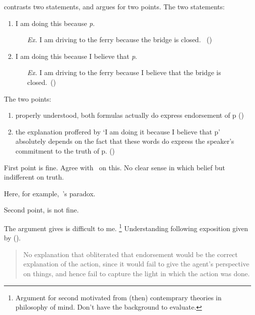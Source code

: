 \begin{note}[Distinction]
  \citeauthor{Collins:1997wn} contrasts two statements, and argues for two points.
  The two statements:
  \begin{enumerate}[noitemsep]
  \item
    I am doing this because \emph{p}.
    \begin{itemize}[noitemsep]
    \item[\emph{Ex.}]
      I am driving to the ferry because the bridge is closed.\newline
      \mbox{ }\hfill(\citeyear[108]{Collins:1997wn})
    \end{itemize}
  \item
    I am doing this because I believe that \emph{p}.
    \begin{itemize}[noitemsep]
    \item[\emph{Ex.}]
      I am driving to the ferry because I believe that the bridge is closed.\newline \mbox{ }\hfill(\citeyear[109]{Collins:1997wn})
    \end{itemize}
  \end{enumerate}
  The two points:
  \begin{enumerate}
  \item
    properly understood, both formulas actually do express endorsement of p (\citeyear[117--118]{Collins:1997wn})
  \item
    the explanation proffered by ‘I am doing it because I believe that p’ absolutely depends on the fact that these words do express the speaker’s commitment to the truth of p.
    (\citeyear[118]{Collins:1997wn})
  \end{enumerate}

  First point is fine.
  Agree with~\citeauthor{Collins:1997wn} on this.
  No clear sense in which belief but indifferent on truth.

  Here, for example,~\citeauthor{Moore:1993wk}'s paradox.

  Second point, is not fine.

  The argument \citeauthor{Collins:1997wn} gives is difficult to me.%
  \footnote{
    Argument for second motivated from (then) contemprary theories in philosophy of mind.
    Don't have the background to evaluate.
  }
  Understanding following exposition given by \citeauthor{Dancy:2000aa} (\citeyear{Dancy:2000aa}).

  \begin{quote}
    No explanation that obliterated that endorsement would be the correct explanation of the action, since it would fail to give the agent’s perspective on things, and hence fail to capture the light in which the action was done.
    \citeyear[108]{Dancy:2000aa}
  \end{quote}


\end{note}
